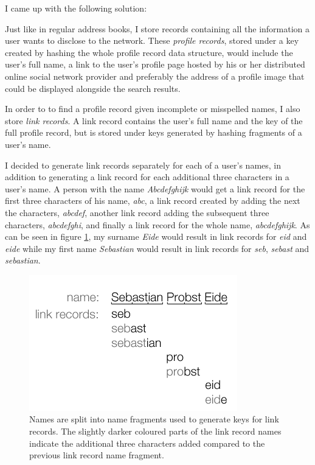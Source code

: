 I came up with the following solution:

Just like in regular address books, I store records containing all the information a user wants to disclose to the network. These \emph{profile records}, stored under a key created by hashing the whole profile record data structure, would include the user's full name, a link to the user's profile page hosted by his or her distributed online social network provider and preferably the address of a profile image that could be displayed alongside the search results.

In order to to find a profile record given incomplete or misspelled names, I also store \emph{link records}. A link record contains the user's full name and the key of the full profile record, but is stored under keys generated by hashing fragments of a user's name. 

I decided to generate link records separately for each of a user's names, in addition to generating a link record for each additional three characters in a user's name. A person with the name \emph{Abcdefghijk} would get a link record for the first three characters of his name, \emph{abc}, a link record created by adding the next the characters, \emph{abcdef}, another link record adding the subsequent three characters, \emph{abcdefghi}, and finally a link record for the whole name, \emph{abcdefghijk}.
As can be seen in figure \ref{figLinkRecord}, my surname \emph{Eide} would result in link records for \emph{eid} and \emph{eide} while my first name \emph{Sebastian} would result in link records for \emph{seb}, \emph{sebast} and \emph{sebastian}.

\begin{figure}[!htb]
\begin{center}
	\includegraphics[width=0.6\linewidth]{illustrations/LinkRecords.png}
  \caption{Names are split into name fragments used to generate keys for link records. The slightly darker coloured parts of the link record names indicate the additional three characters added compared to the previous link record name fragment.}
  \label{figLinkRecord}
\end{center}
\end{figure}

